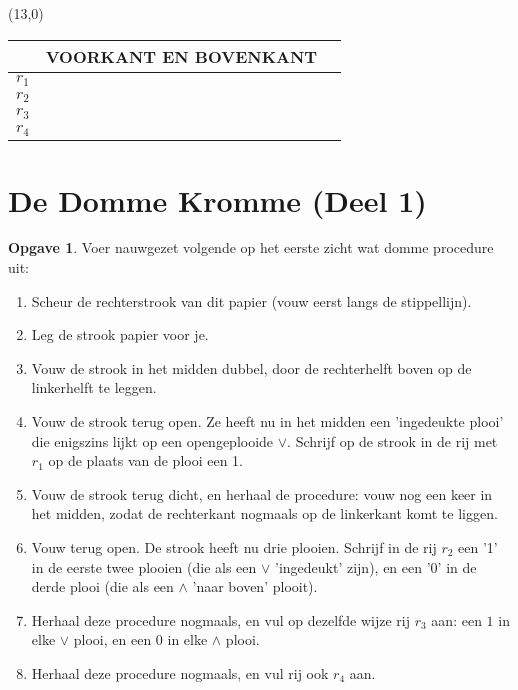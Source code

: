 \documentclass[12pt]{article}
\author{Wim Obbels}
\theoremstyle{definition}
\newtheorem{opgave}{Opgave}
\begin{document}
\textblockorigin{0mm}{0mm}
\begin{textblock}{1}(13,0)
\begin{turn}{90}
\ScissorLeft
\begin{tabularx}{\paperheight}{p{1cm}| X  p{1cm}}
\hdashline
\ScissorRightBrokenTop	& VOORKANT EN BOVENKANT & \ScissorRightBrokenTop \\
\hline
$r_1$ & & \\	
\hline
$r_2$ & & \\	
\hline
$r_3$ & & \\	
\hline
$r_4$ & & \\	
\hline
\end{tabularx}
\end{turn}
\end{textblock}

\section*{De Domme Kromme (Deel 1)}
			
\begin{opgave}
Voer nauwgezet volgende op het eerste zicht wat domme procedure uit:
\begin{enumerate}
	\setlength\itemsep{0.1em}
	\item Scheur de rechterstrook van dit papier (vouw eerst langs de stippellijn). 
	\item Leg de strook papier voor je.
	\item Vouw de strook in het midden dubbel, door de rechterhelft boven op de linkerhelft te leggen.
	\item Vouw de strook terug open. Ze heeft nu in het midden een 'ingedeukte plooi' die enigszins lijkt op een opengeplooide $\vee$. Schrijf op de strook in de rij met $r_1$ op de plaats van de plooi een 1.
	\item Vouw de strook terug dicht, en herhaal de procedure: vouw nog een keer in het midden, zodat de rechterkant nogmaals op de linkerkant komt te liggen. 
	\item Vouw terug open. De strook heeft nu drie plooien. Schrijf in de rij $r_2$ een '1' in de eerste twee plooien (die als een $\vee$ 'ingedeukt' zijn), en een '0' in de derde plooi (die als een $\wedge$ 'naar boven' plooit).
	\item Herhaal deze procedure nogmaals, en vul op dezelfde wijze rij $r_3$ aan: een $1$ in elke $\vee$ plooi, en een 0 in elke $\wedge$ plooi.
	\item Herhaal deze procedure nogmaals, en vul rij ook $r_4$ aan.
\end{enumerate}

\end{opgave}
\end{document}
